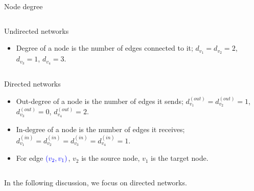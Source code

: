 \documentclass[xcolor=dvipsnames, compress, 10pt]{beamer}
\theoremstyle{remark}
\newcommand{\ind}{d^{(in)}}
\newcommand{\outd}{d^{(out)}}
\begin{document}
\begin{frame}{Node degree}

\begin{columns}
	\begin{column}{0.75\textwidth}
		Undirected networks
		\begin{itemize}
			\item Degree of a node is the number of edges connected to
			it; $d_{v_1} = d_{v_2} = 2$, $d_{v_3} = 1$, $d_{v_4} = 3$.
		\end{itemize}
	\end{column}
	\begin{column}{0.2\textwidth}
		\scalebox{0.7}{}
	\end{column}
\end{columns}

\vspace{0.2cm}

\begin{columns}
	\begin{column}{0.75\textwidth}
		Directed networks
		\begin{itemize}
			\item Out-degree of a node is the number of edges it sends;
			$\outd_{v_1} = \outd_{v_2} = 1$, $\outd_{v_3} = 0$, 
			$\outd_{v_4} = 2$.
			\item In-degree of a node is the number of edges it receives;
			$\ind_{v_1} = \ind_{v_2} = \ind_{v_3} = \ind_{v_4} = 1$.
			\item For edge $\color{blue}{(v_2, v_1)}$, $v_2$ is the source node,
			$v_1$ is the target node.
		\end{itemize}
	\end{column}
	\begin{column}{0.2\textwidth}
		\scalebox{0.7}{}
	\end{column}
\end{columns}

\vfill

In the following discussion, we focus on directed networks.

\end{frame}

\end{document}
